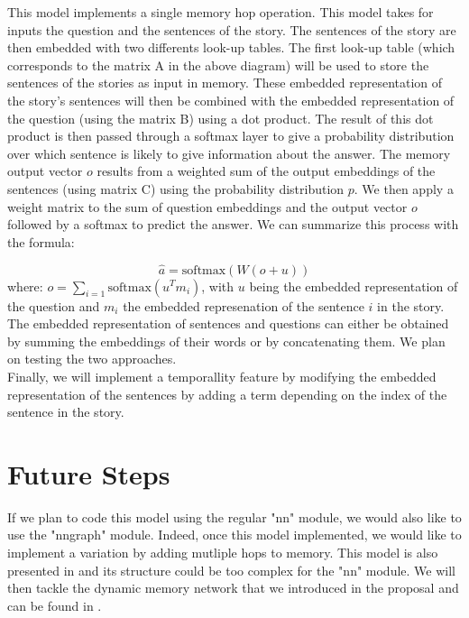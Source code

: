 \documentclass[paper=a4, fontsize=11pt]{scrartcl} %
\numberwithin{equation}{section} %
\numberwithin{figure}{section} %
\numberwithin{table}{section} %
\begin{document}
This model implements a single memory hop operation. This model takes for inputs the question and the sentences of the story. The sentences of the story are then embedded with two differents look-up tables. The first look-up table (which corresponds to the matrix A in the above diagram) will be used to store the sentences of the stories as input in memory. These embedded representation of the story's sentences will then be combined with the embedded representation of the question (using the matrix B) using a dot product. The result of this dot product is then passed through a softmax layer to give a probability distribution over which sentence is likely to give information about the answer. The memory output vector $o$ results from a weighted sum of the output embeddings of the sentences (using matrix C) using the probability distribution $p$. We then apply a weight matrix to the sum of question embeddings and the output vector $o$ followed by a softmax to predict the answer. We can summarize this process with the formula:

$$\hat{a} = \text{softmax}\left(W(o+u)\right)$$
where: $ o = \sum\limits_{i=1}\text{softmax}(u^Tm_i)$, with $u$ being the embedded representation of the question and $m_i$ the embedded represenation of the sentence $i$ in the story.\\

The embedded representation of sentences and questions can either be obtained by summing the embeddings of their words or by concatenating them. We plan on testing the two approaches.\\

Finally, we will implement a temporallity feature by modifying the embedded representation of the sentences by adding a term depending on the index of the sentence in the story.

\section{Future Steps}

If we plan to code this model using the regular "nn" module, we would also like to use the "nngraph" module. Indeed, once this model implemented, we would like to implement a variation by adding mutliple hops to memory. This model is also presented in \cite{mem} and its structure could be too complex for the "nn" module. We will then tackle the dynamic memory network that we introduced in the proposal and can be found in \cite{dmn}.


\end{document}
